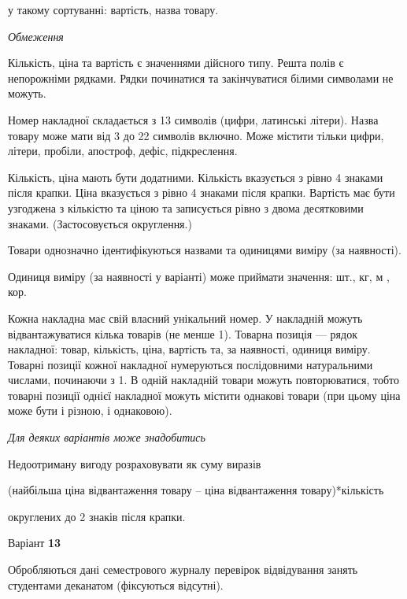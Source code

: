 \documentclass[11pt, ukrainian]{article}
\begin{document}
{\noindent}у такому сортуванні: вартість, назва товару.


\bigskip\textit{Обмеження}

Кількість, ціна та вартість є значеннями дійсного типу.
Решта полів є непорожніми рядками.
Рядки починатися та закінчуватися білими символами не можуть.

Номер накладної складається з 13 символів (цифри, латинські літери).
Назва товару може мати від 3 до 22 символів включно.
Може містити тільки цифри, літери, пробіли, апостроф, дефіс, підкреслення.

Кількість, ціна мають бути додатними.
Кількість вказується з рівно 4 знаками після крапки.
Ціна вказується з рівно 4 знаками після крапки.
Вартість має бути узгоджена з кількістю та ціною та записується рівно з двома десятковими знаками.
(Застосовується округлення.)

Товари однозначно ідентифікуються назвами та одиницями виміру (за наявності).

Одиниця виміру (за наявності у варіанті) може приймати значення: шт., кг, м , кор.

Кожна накладна має свій власний унікальний номер.
У накладній можуть відвантажуватися кілька товарів (не менше 1).
Товарна позиція --- рядок накладної: товар, кількість, ціна, вартість та, за наявності, одиниця виміру.
Товарні позиції кожної накладної нумеруються послідовними натуральними числами, починаючи з 1.
В одній накладній товари можуть повторюватися, 
тобто товарні позиції однієї накладної можуть містити однакові товари 
(при цьому ціна може бути і різною, і однаковою).

\bigskip\textit{Для деяких варіантів може знадобитись}

Недоотриману вигоду розраховувати як суму виразів
{\center (найбільша ціна відвантаження товару – ціна відвантаження товару)*кількість\par}

\bigskip
{\noindent} округлених до 2 знаків після крапки.




\par
\newpage

{\center Варіант  \No \textbf { 13 }\par}
\bigskip
Обробляються дані семестрового журналу перевірок відвідування занять студентами деканатом (фіксуються відсутні). 
\end{document}
